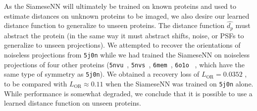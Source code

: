 As the SiameseNN will ultimately be trained on known proteins and used to estimate distances on unknown proteins to be imaged,
we also desire our learned distance function to generalize to unseen proteins.
The distance function $\widehat{d_p}$ must abstract the protein (in the same way it must abstract shifts, noise, or PSFs to generalize to unseen projections).
We attempted to recover the orientations of noiseless projections from \texttt{5j0n} while we had trained the SiameseNN on noiseless projections of four other proteins (\texttt{5nvu}~\cite{5nvu_pdb}, \texttt{5nvs}~\cite{5nvs_pdb}, \texttt{6mem}~\cite{6mem_pdb}, \texttt{6o1o}~\cite{6o1o_pdb} , which have the same type of symmetry as \texttt{5j0n}).
We obtained a recovery loss of $L_\text{OR} = 0.0352$ ,
to be compared with $L_\text{OR} \approx 0.11$ when the SiameseNN was trained on \texttt{5j0n} alone.
While performance is somewhat degraded, we conclude that it is possible to use a learned distance function on unseen proteins.

